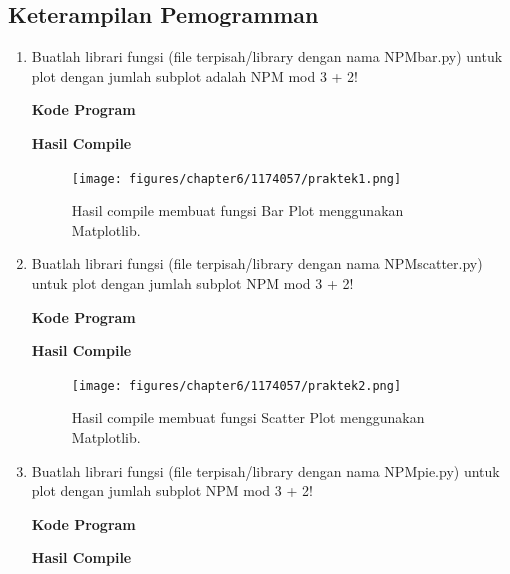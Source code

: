 	\subsection{Keterampilan Pemogramman}
	\begin{enumerate}
		\item Buatlah librari fungsi (file terpisah/library dengan nama NPMbar.py) untuk plot dengan jumlah subplot adalah NPM mod 3 + 2!

			\hfill \break
			\textbf{Kode Program}

			

			\hfill \break
			\textbf{Hasil Compile}

			\begin{figure}[H]
				\texttt{[image: figures/chapter6/1174057/praktek1.png]}
				\centering
				\caption{Hasil compile membuat fungsi Bar Plot menggunakan Matplotlib.}
			\end{figure}
			
		\item Buatlah librari fungsi (file terpisah/library dengan nama NPMscatter.py) untuk plot dengan jumlah subplot NPM mod 3 + 2!
					
			\hfill \break
			\textbf{Kode Program}

			

			\hfill \break
			\textbf{Hasil Compile}

			\begin{figure}[H]
				\texttt{[image: figures/chapter6/1174057/praktek2.png]}
				\centering
				\caption{Hasil compile membuat fungsi Scatter Plot menggunakan Matplotlib.}
			\end{figure}

		\item Buatlah librari fungsi (file terpisah/library dengan nama NPMpie.py) untuk plot dengan jumlah subplot NPM mod 3 + 2!

			\hfill \break
			\textbf{Kode Program}

			

			\hfill \break
			\textbf{Hasil Compile}


\end{enumerate}
